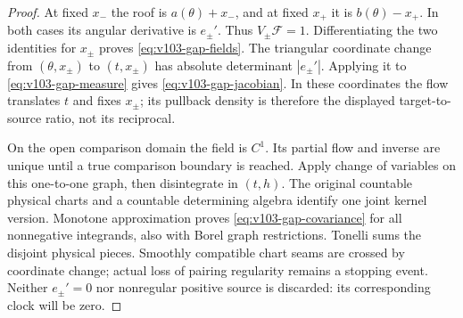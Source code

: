 \begin{proof}
At fixed $x_-$ the roof is $a(\theta)+x_-$, and at fixed $x_+$
it is $b(\theta)-x_+$. In both cases its angular derivative is
$e_\pm'$. Thus $V_\pm\mathscr F=1$. Differentiating the two
identities for $x_\pm$ proves \eqref{eq:v103-gap-fields}.
The triangular coordinate change from $(\theta,x_\pm)$ to
$(t,x_\pm)$ has absolute determinant $|e_\pm'|$. Applying it to
\eqref{eq:v103-gap-measure} gives \eqref{eq:v103-gap-jacobian}.
In these coordinates the flow translates $t$ and fixes $x_\pm$;
its pullback density is therefore the displayed target-to-source
ratio, not its reciprocal.

On the open comparison domain the field is $C^1$. Its partial flow
and inverse are unique until a true comparison boundary is reached.
Apply change of variables on this one-to-one graph, then disintegrate
in $(t,h)$. The original countable physical charts and a countable
determining algebra identify one joint kernel version. Monotone
approximation proves \eqref{eq:v103-gap-covariance} for all
nonnegative integrands, also with Borel graph restrictions. Tonelli
sums the disjoint physical pieces. Smoothly compatible chart seams
are crossed by coordinate change; actual loss of pairing regularity
remains a stopping event. Neither $e_\pm'=0$ nor nonregular positive
source is discarded: its corresponding clock will be zero.
\end{proof}


